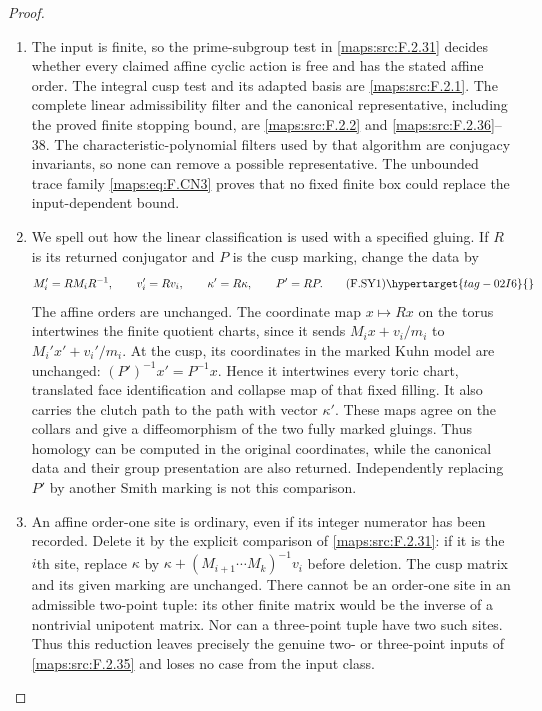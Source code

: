 \begin{proof}
\begin{enumerate}[label={$\langle1\rangle$\arabic*.}]
\item The input is finite, so the prime-subgroup test in \ref{maps:src:F.2.31}
decides whether every claimed affine cyclic action is free
and has the stated affine order.  The integral cusp test and
its adapted basis are \ref{maps:src:F.2.1}.  The complete linear admissibility
filter and the canonical representative, including the proved
finite stopping bound, are \ref{maps:src:F.2.2} and \ref{maps:src:F.2.36}--38.  The
characteristic-polynomial filters used by that algorithm are
conjugacy invariants, so none can remove a possible
representative.  The unbounded trace family \eqref{maps:eq:F.CN3} proves
that no fixed finite box could replace the input-dependent
bound.

\item We spell out how the linear classification is used with a
specified gluing.  If $R$ is its returned conjugator and
$P$ is the cusp marking, change the data by
\[
 M_i'=RM_iR^{-1},\qquad v_i'=Rv_i,\qquad
 \kappa'=R\kappa,\qquad P'=RP.                           \tag{F.SY1}\hypertarget{tag-02I6}{}\label{maps:eq:F.SY1}
\]
The affine orders are unchanged.  The coordinate map
$x\mapsto Rx$ on the torus intertwines the finite quotient
charts, since it sends $M_ix+v_i/m_i$ to
$M_i'x'+v_i'/m_i$.  At the cusp, its coordinates in the
marked Kuhn model are unchanged:
$(P')^{-1}x'=P^{-1}x$.  Hence it intertwines every toric
chart, translated face identification and collapse map of
that fixed filling.  It also carries the clutch path to
the path with vector $\kappa'$.  These maps agree on the
collars and give a diffeomorphism of the two fully marked
gluings.  Thus homology can be computed in the original
coordinates, while the canonical data and their group
presentation are also returned.  Independently replacing
$P'$ by another Smith marking is not this comparison.

\item An affine order-one site is ordinary, even if its integer
numerator has been recorded.  Delete it by the explicit comparison of \cref{maps:src:F.2.31}: if it is the $i$th site, replace
$\kappa$ by
$\kappa+(M_{i+1}\cdots M_k)^{-1}v_i$ before deletion.
The cusp matrix and its given marking are unchanged.
There cannot be an order-one site in an admissible two-point
tuple: its other finite matrix would be the inverse of a
nontrivial unipotent matrix.  Nor can a three-point tuple
have two such sites.  Thus this reduction leaves precisely
the genuine two- or three-point inputs of \ref{maps:src:F.2.35} and loses
no case from the input class.


\end{enumerate}
\end{proof}
